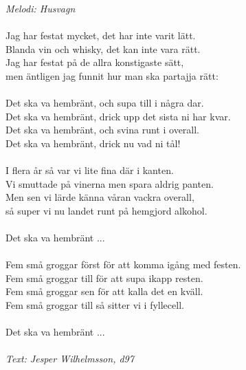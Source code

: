 {\footnotesize\textit{Melodi: Husvagn}}\\
\\
Jag har festat mycket, det har inte varit lätt.\\
Blanda vin och whisky, det kan inte vara rätt.\\
Jag har festat på de allra konstigaste sätt,\\
men äntligen jag funnit hur man ska partajja rätt:\\
\\
Det ska va hembränt, och supa till i några dar.\\
Det ska va hembränt, drick upp det sista ni har kvar.\\
Det ska va hembränt, och svina runt i overall.\\
Det ska va hembränt, drick nu vad ni tål!\\
\\
I flera år så var vi lite fina där i kanten.\\
Vi smuttade på vinerna men spara aldrig panten.\\
Men sen vi lärde känna våran vackra overall,\\
så super vi nu landet runt på hemgjord alkohol.\\
\\
Det ska va hembränt ...\\
\\
Fem små groggar först för att komma igång med festen.\\
Fem små groggar till för att supa ikapp resten.\\
Fem små groggar sen för att kalla det en kväll.\\
Fem små groggar till så sitter vi i fyllecell.\\
\\
Det ska va hembränt ...\\
\\
{\footnotesize\textit{Text: Jesper Wilhelmsson, d97}}
